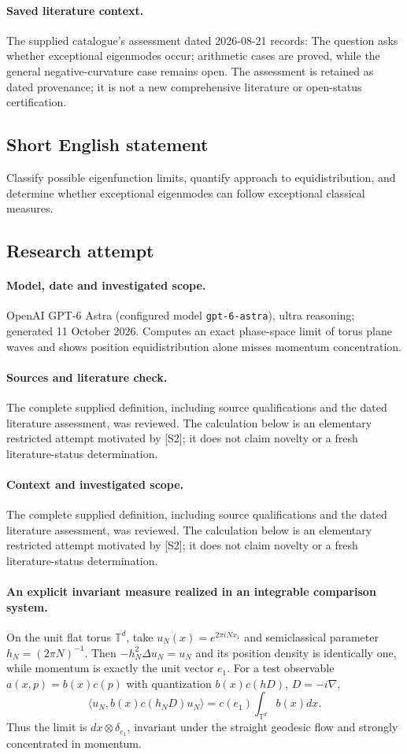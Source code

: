 \documentclass[11pt]{article}
\begin{document}
\paragraph{Saved literature context.} The supplied catalogue's assessment dated 2026-08-21 records: The question asks whether exceptional eigenmodes occur; arithmetic cases are proved, while the general negative-curvature case remains open. The assessment is retained as dated provenance; it is not a new comprehensive literature or open-status certification.
\subsection{Short English statement}
Classify possible eigenfunction limits, quantify approach to equidistribution, and determine whether exceptional eigenmodes can follow exceptional classical measures.
\subsection{Research attempt}
\paragraph{Model, date and investigated scope.}
OpenAI GPT-6 Astra (configured model \texttt{gpt-6-astra}), ultra reasoning; generated 11 October 2026. Computes an exact phase-space limit of torus plane waves and shows position equidistribution alone misses momentum concentration.

\paragraph{Sources and literature check.}
The complete supplied definition, including source qualifications and the dated literature assessment, was reviewed. The calculation below is an elementary restricted attempt motivated by [S2]; it does not claim novelty or a fresh literature-status determination.

\paragraph{Context and investigated scope.} The complete supplied definition, including source qualifications and the dated literature assessment, was reviewed. The calculation below is an elementary restricted attempt motivated by [S2]; it does not claim novelty or a fresh literature-status determination.

\paragraph{An explicit invariant measure realized in an integrable comparison system.} On the unit flat torus $\mathbb T^d$, take $u_N(x)=e^{2\pi iNx_1}$ and semiclassical parameter $h_N=(2\pi N)^{-1}$. Then $-h_N^2\Delta u_N=u_N$ and its position density is identically one, while momentum is exactly the unit vector $e_1$. For a test observable $a(x,p)=b(x)c(p)$ with quantization $b(x)c(hD)$, $D=-i\nabla$,
\[
 \langle u_N,b(x)c(h_ND)u_N\rangle=c(e_1)\int_{\mathbb T^d}b(x)dx.
\]
Thus the limit is $dx\otimes\delta_{e_1}$, invariant under the straight geodesic flow and strongly concentrated in momentum.
\end{document}
